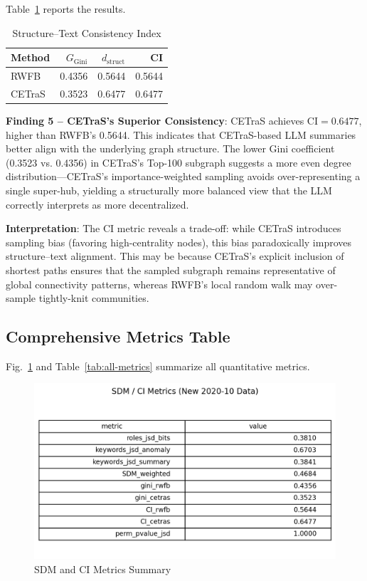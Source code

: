 Table~\ref{tab:ci-results} reports the results.

\begin{table}[!t]
\centering
\caption{Structure--Text Consistency Index}
\label{tab:ci-results}
\begin{tabular}{l r r r}
\toprule
Method & $G_{\text{Gini}}$ & $d_{\text{struct}}$ & CI \\
\midrule
RWFB & 0.4356 & 0.5644 & 0.5644 \\
CETraS & 0.3523 & 0.6477 & 0.6477 \\
\bottomrule
\end{tabular}
\end{table}

\textbf{Finding 5 -- CETraS's Superior Consistency}: CETraS achieves $\text{CI}=0.6477$, higher than RWFB's 0.5644. This indicates that CETraS-based LLM summaries better align with the underlying graph structure. The lower Gini coefficient (0.3523 vs. 0.4356) in CETraS's Top-100 subgraph suggests a more even degree distribution---CETraS's importance-weighted sampling avoids over-representing a single super-hub, yielding a structurally more balanced view that the LLM correctly interprets as more decentralized.

\textbf{Interpretation}: The CI metric reveals a trade-off: while CETraS introduces sampling bias (favoring high-centrality nodes), this bias paradoxically improves structure--text alignment. This may be because CETraS's explicit inclusion of shortest paths ensures that the sampled subgraph remains representative of global connectivity patterns, whereas RWFB's local random walk may over-sample tightly-knit communities.

\subsection{Comprehensive Metrics Table}

Fig.~\ref{fig:metrics-table} and Table~\ref{tab:all-metrics} summarize all quantitative metrics.

\begin{figure}[!t]
  \centering
  \includegraphics[width=0.9\linewidth]{new_analysis/outputs/compare/smd_ci_table.png}
  \caption{SDM and CI Metrics Summary}
  \label{fig:metrics-table}
\end{figure}

